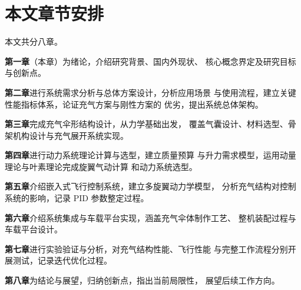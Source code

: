 \section{本文章节安排}

本文共分八章。

\textbf{第一章}（本章）为绪论，介绍研究背景、国内外现状、
核心概念界定及研究目标与创新点。

\textbf{第二章}进行系统需求分析与总体方案设计，分析应用场景
与使用流程，建立关键性能指标体系，论证充气方案与刚性方案的
优劣，提出系统总体架构。

\textbf{第三章}完成充气伞形结构设计，从力学基础出发，
覆盖气囊设计、材料选型、骨架机构设计与充气展开系统实现。

\textbf{第四章}进行动力系统理论计算与选型，建立质量预算
与升力需求模型，运用动量理论与叶素理论完成旋翼气动计算
和动力系统选型。

\textbf{第五章}介绍嵌入式飞行控制系统，建立多旋翼动力学模型，
分析充气结构对控制系统的影响，记录 PID 参数整定过程。

\textbf{第六章}介绍系统集成与车载平台实现，涵盖充气伞体制作工艺、
整机装配过程与车载平台设计。

\textbf{第七章}进行实验验证与分析，对充气结构性能、飞行性能
与完整工作流程分别开展测试，记录迭代优化过程。

\textbf{第八章}为结论与展望，归纳创新点，指出当前局限性，
展望后续工作方向。